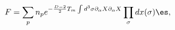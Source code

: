 \begin{equation}
F = \sum_p n_p e^{- \frac{D-2}{2} T_m \int d^3 \sigma \partial_\alpha 
X \partial_\alpha X} \prod_\sigma d x(\sigma) \es,
\label{eq:FbfrSum}
\end{equation}

